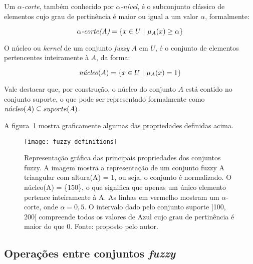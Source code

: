 \begin{defn}
Um $\alpha$\emph{-corte}, também conhecido por $\alpha$\emph{-nível}, é o subconjunto clássico de elementos cujo grau de pertinência é maior ou igual a um valor $\alpha$, formalmente:

\begin{equation}
  \alpha\emph{-corte(A)} = \{x \in U \ |\ \mu_A(x) \geq \alpha \}
\label{equ:conjunto_fuzzy_alpha_corte}
\end{equation}
\end{defn}

\begin{defn}
O núcleo ou \emph{kernel} de um conjunto \emph{fuzzy} $A$ em $U$, é o conjunto de elementos pertencentes inteiramente à $A$, da forma:

\begin{equation}
  \emph{núcleo}(A) = \{x \in U \ |\ \mu_A(x) = 1 \}
\label{equ:conjunto_fuzzy_kernel}
\end{equation}
\end{defn}

Vale destacar que, por construção, o núcleo do conjunto $A$ está contido no conjunto suporte, o que pode ser representado formalmente como $\emph{núcleo}(A) \subseteq suporte(A)$.

A figura~\ref{fig:fuzzy_definitions} mostra graficamente algumas das propriedades definidas acima.

\begin{figure}[!h]
  \centering
  \texttt{[image: fuzzy\_definitions]}
  \caption[Representação gráfica das principais propriedades dos conjuntos \emph{fuzzy}]{Representação gráfica das principais propriedades dos conjuntos fuzzy. A imagem mostra a representação de um conjunto fuzzy A triangular com altura(A) = 1, ou seja, o conjunto é normalizado. O núcleo(A) = \{150\}, o que significa que apenas um único elemento pertence inteiramente à A. As linhas em vermelho mostram um $\alpha$-corte, onde $\alpha = 0,5$. O intervalo dado pelo conjunto suporte ]100, 200[ compreende todos os valores de Azul cujo grau de pertinência é maior do que 0. Fonte: proposto pelo autor.}
  \label{fig:fuzzy_definitions} 
\end{figure}

\subsection{Operações entre conjuntos \emph{fuzzy}}
\label{sec:operacoes_conjuntos_fuzzy}

